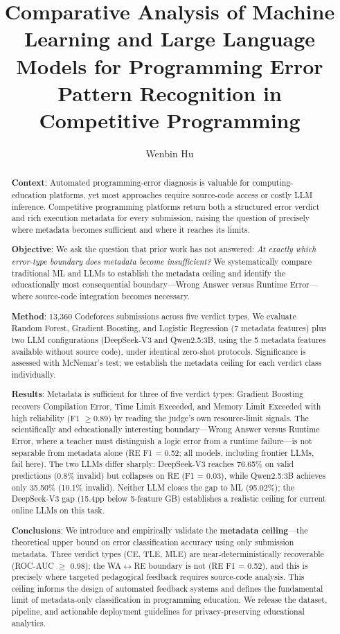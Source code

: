 \documentclass[acmsmall]{acmart}
\title{Comparative Analysis of Machine Learning and Large Language Models
 for Programming Error Pattern Recognition in Competitive Programming}
\author{Wenbin Hu}
\affiliation{
 \institution{School of Computer Science, Xijing University}
 \city{Xi'an}
 \country{China}
}
\begin{document}
\begin{abstract}
\noindent\textbf{Context}: Automated programming-error diagnosis is valuable for
computing-education platforms, yet most approaches require source-code access
or costly LLM inference. Competitive programming platforms return both a
structured error verdict and rich execution metadata for every submission,
raising the question of precisely where metadata becomes sufficient and where
it reaches its limits.

\noindent\textbf{Objective}: We ask the question that prior work has not answered:
\textit{At exactly which error-type boundary does metadata become insufficient?}
We systematically compare traditional ML and LLMs to establish the metadata
ceiling and identify the educationally most consequential boundary---Wrong
Answer versus Runtime Error---where source-code integration becomes necessary.

\noindent\textbf{Method}: 13,360 Codeforces submissions across five verdict types.
We evaluate Random Forest, Gradient Boosting, and Logistic Regression (7 metadata
features) plus two LLM configurations (DeepSeek-V3 and Qwen2.5:3B, using the 5
metadata features available without source code), under identical zero-shot
protocols. Significance is assessed with McNemar's test; we establish the metadata
ceiling for each verdict class individually.

\noindent\textbf{Results}: Metadata is sufficient for three of five verdict types:
Gradient Boosting recovers Compilation Error, Time Limit Exceeded, and Memory
Limit Exceeded with high reliability (F1 $\ge$0.89) by reading the judge's
own resource-limit signals. The scientifically and educationally interesting
boundary---Wrong Answer versus Runtime Error, where a teacher must distinguish
a logic error from a runtime failure---is not separable from metadata alone
(RE F1 = 0.52; all models, including frontier LLMs, fail here). The two LLMs
differ sharply: DeepSeek-V3 reaches 76.65\% on valid predictions (0.8\%
invalid) but collapses on RE (F1 = 0.03), while Qwen2.5:3B achieves only
35.50\% (10.1\% invalid). Neither LLM closes the gap to ML (95.02\%); the
DeepSeek-V3 gap (15.4pp below 5-feature GB) establishes a realistic ceiling for current online
LLMs on this task.

\noindent\textbf{Conclusions}: We introduce and empirically validate the
\textbf{metadata ceiling}---the theoretical upper bound on error classification
accuracy using only submission metadata. Three verdict types (CE, TLE, MLE) are
near-deterministically recoverable (ROC-AUC $\geq$ 0.98); the WA$\leftrightarrow$RE
boundary is not (RE F1 = 0.52), and this is precisely where targeted pedagogical
feedback requires source-code analysis. This ceiling informs the design of
automated feedback systems and defines the fundamental limit of metadata-only
classification in programming education. We release the dataset,
pipeline, and actionable deployment guidelines for privacy-preserving
educational analytics.

\end{abstract}
\end{document}
